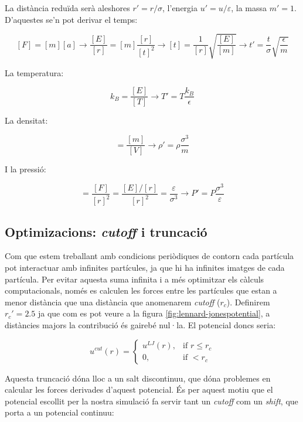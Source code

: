 \documentclass[a4paper,10pt]{article}
\begin{document}
La distància reduïda serà aleshores $r' = r/\sigma$, l'energia $u' = u/\varepsilon$, la massa $m' = 1$. D'aquestes se'n pot derivar el temps:

$$ [F] = [m][a] \to \frac{[E]}{[r]} = [m]\frac{[r]}{[t]^2} \to [t] = \frac{1}{[r]}\sqrt{\frac{[E]}{[m]}} \to t' =  \frac{t}{\sigma}\sqrt{\frac{\epsilon}{m}} $$ 

La temperatura:

$$ k_B = \frac{[E]}{[T]} \to T' = T \frac{k_B}{\epsilon} $$

La densitat:

\begin{equation}
	[\rho] = \frac{[m]}{[V]} \to \rho' = \rho \frac{\sigma^3}{m}
\end{equation} 

I la pressió:

\begin{equation}
	[P] = \frac{[F]}{[r]^2} = \frac{[E]/[r]}{[r]^2} = \frac{\varepsilon}{\sigma^3} \to P' = P \frac{\sigma^3}{\varepsilon}
\end{equation}



\subsection{Optimizacions: \textit{cutoff} i truncació}
Com que estem treballant amb condicions periòdiques de contorn cada partícula pot interactuar amb infinites partícules, ja que hi ha infinites imatges de cada partícula. Per evitar aquesta suma infinita i a més optimitzar els càlculs computacionals, només es calculen les forces entre les partícules que estan a menor distància que una distància que anomenarem \textit{cutoff} ($r_c$). Definirem $r_c' = 2.5$ ja que com es pot veure a la figura \ref{fig:lennard-jonespotential}, a distàncies majors la contribució és gairebé nul·la. El potencial doncs seria:

$$ u^{cut}(r) = \left\{ \begin{array}{lcc} u^{LJ}(r), & \text{if } r \leq r_c \\ 0,  & \text{if } < r_c  \end{array} \right.$$

Aquesta truncació dóna lloc a un salt discontinuu, que dóna problemes en calcular les forces derivades d'aquest potencial. És per aquest motiu que el potencial escollit per la nostra simulació fa servir tant un \textit{cutoff} com un \textit{shift}, que porta a un potencial continuu: 
\end{document}
